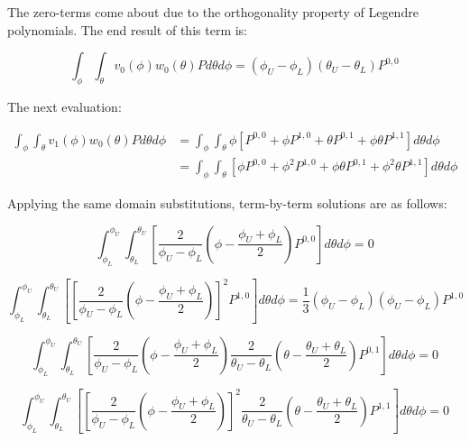 \documentclass[12pt,a4paper,pagesize=pdftex]{scrartcl}
\begin{document}
The zero-terms come about due to the orthogonality property of Legendre polynomials. The end result of this term is:

\begin{equation*}
    \int_\phi \int_\theta v_0\left(\phi\right) w_0\left(\theta\right) P d\theta d\phi = \boxed{\left(\phi_U - \phi_L\right) \left(\theta_U - \theta_L\right) P^{0,0}}
\end{equation*}

The next evaluation:

\begin{align*}
    \int_\phi \int_\theta v_1\left(\phi\right) w_0\left(\theta\right) P d\theta d\phi &= \int_\phi \int_\theta \phi \left[P^{0,0} + \phi P^{1,0} + \theta P^{0,1} + \phi \theta P^{1,1} \right] d\theta d\phi \\
    & = \int_\phi \int_\theta \left[\phi P^{0,0} + \phi^2 P^{1,0} + \phi \theta P^{0,1} + \phi^2 \theta P^{1,1}\right] d\theta d\phi
\end{align*}

Applying the same domain substitutions, term-by-term solutions are as follows:

\begin{equation*}
    \int_{\phi_L}^{\phi_U} \int_{\theta_L}^{\theta_U} \left[\frac{2}{\phi_U - \phi_L} \left(\phi - \frac{\phi_U + \phi_L}{2}\right) P^{0,0}\right] d\theta d\phi = 0
\end{equation*}

\begin{equation*}
    \int_{\phi_L}^{\phi_U} \int_{\theta_L}^{\theta_U} \left[\left[\frac{2}{\phi_U - \phi_L} \left(\phi - \frac{\phi_U + \phi_L}{2}\right)\right]^2 P^{1,0}\right] d\theta d\phi = \frac{1}{3}\left(\phi_U - \phi_L\right) \left(\phi_U - \phi_L\right) P^{1,0}
\end{equation*}

\begin{equation*}
    \int_{\phi_L}^{\phi_U} \int_{\theta_L}^{\theta_U} \left[\frac{2}{\phi_U - \phi_L} \left(\phi - \frac{\phi_U + \phi_L}{2}\right) \frac{2}{\theta_U - \theta_L} \left(\theta - \frac{\theta_U + \theta_L}{2}\right) P^{0,1}\right] d\theta d\phi = 0
\end{equation*}

\begin{equation*}
    \int_{\phi_L}^{\phi_U} \int_{\theta_L}^{\theta_U} \left[\left[\frac{2}{\phi_U - \phi_L} \left(\phi - \frac{\phi_U + \phi_L}{2}\right)\right]^2 \frac{2}{\theta_U - \theta_L} \left(\theta - \frac{\theta_U + \theta_L}{2}\right) P^{1,1}\right] d\theta d\phi = 0
\end{equation*}
\end{document}
